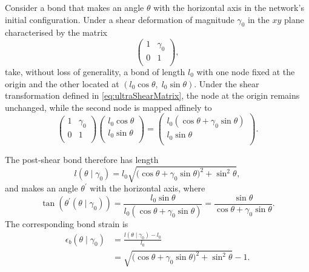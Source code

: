 Consider a bond that makes an angle $\theta$ with the horizontal axis in the network’s initial configuration. Under a shear deformation of magnitude $\gamma_0$ in the $xy$ plane characterised by the matrix
\begin{equation}
    \left(\begin{matrix}
        1 & \gamma_0 \\
        0 & 1 \\
    \end{matrix}\right),
    \label{eq:ultraShearMatrix}
\end{equation}
take, without loss of generality, a bond of length $l_0$ with one node fixed at the origin and the other located at $(l_0 \cos\theta,\; l_0 \sin\theta)$. Under the shear transformation defined in \cref{eq:ultraShearMatrix}, the node at the origin remains unchanged, while the second node is mapped affinely to
\begin{equation*}
    \left(\begin{matrix}
        1 & \gamma_0 \\
        0 & 1 \\
    \end{matrix}\right)
    \left(\begin{matrix}
        l_0\cos\theta \\
        l_0\sin\theta \\
    \end{matrix}\right)
    =
    \left(\begin{matrix}
        l_0(\cos\theta + \gamma_0\sin\theta) \\
        l_0\sin\theta \\
    \end{matrix}\right).
\end{equation*}

The post-shear bond therefore has length
\begin{equation}
l(\theta \mid \gamma_0)
= l_0 \sqrt{\bigl(\cos\theta + \gamma_0 \sin\theta\bigr)^2 + \sin^2\theta},
\end{equation}
and makes an angle $\theta^\prime$ with the horizontal axis, where
\begin{equation}
\tan\left( \theta^\prime(\theta \mid \gamma_0) \right)
= \frac{l_0\sin\theta}{l_0(\cos\theta + \gamma_0\sin\theta)}
= \frac{\sin\theta}{\cos\theta + \gamma_0\sin\theta}.
\end{equation}
The corresponding bond strain is
\begin{align}
\epsilon_b(\theta \mid \gamma_0)
&= \frac{l(\theta \mid \gamma_0) - l_0}{l_0} \\
&= \sqrt{\bigl(\cos\theta + \gamma_0 \sin\theta\bigr)^2 + \sin^2\theta} - 1.
\end{align}

